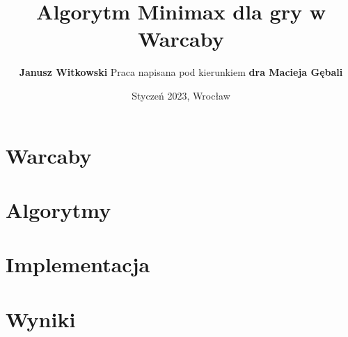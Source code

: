 \documentclass{beamer}
\title{Algorytm Minimax dla gry w Warcaby}
\author{
	\textbf{Janusz Witkowski}
	\newline \newline
	Praca napisana pod kierunkiem \textbf{dra Macieja Gębali}
}
\date{Styczeń 2023, Wrocław}
\newcommand{\myitem}{\item[$\vartriangleright$]}
\begin{document}
\begin{frame}[plain]{}
	\titlepage
\end{frame}


\section{Warcaby}

\section{Algorytmy}

\section{Implementacja}



\section{Wyniki}





\end{document}
